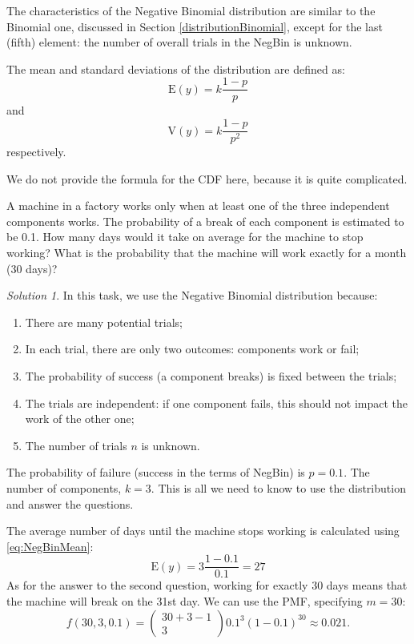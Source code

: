 \documentclass[
]{book}
\providecommand{\tightlist}{%
  \setlength{\itemsep}{0pt}\setlength{\parskip}{0pt}}
\theoremstyle{definition}
\theoremstyle{definition}
\theoremstyle{definition}
\theoremstyle{definition}
\theoremstyle{remark}
\newtheorem*{solution}{Solution}
\begin{document}
The characteristics of the Negative Binomial distribution are similar to the Binomial one, discussed in Section \ref{distributionBinomial}, except for the last (fifth) element: the number of overall trials in the NegBin is unknown.

The mean and standard deviations of the distribution are defined as:
\begin{equation}
    \mathrm{E}(y) = k \frac{1-p}{p}
    \label{eq:NegBinMean}
\end{equation}
and
\begin{equation}
    \mathrm{V}(y) = k \frac{1-p}{p^2}
    \label{eq:NegBinVar}
\end{equation}
respectively.

We do not provide the formula for the CDF here, because it is quite complicated.

A machine in a factory works only when at least one of the three independent components works. The probability of a break of each component is estimated to be 0.1. How many days would it take on average for the machine to stop working? What is the probability that the machine will work exactly for a month (30 days)?

\begin{solution}
In this task, we use the Negative Binomial distribution because:

\begin{enumerate}
\def\labelenumi{\arabic{enumi}.}
\tightlist
\item
  There are many potential trials;
\item
  In each trial, there are only two outcomes: components work or fail;
\item
  The probability of success (a component breaks) is fixed between the trials;
\item
  The trials are independent: if one component fails, this should not impact the work of the other one;
\item
  The number of trials \(n\) is unknown.
\end{enumerate}

The probability of failure (success in the terms of NegBin) is \(p=0.1\). The number of components, \(k=3\). This is all we need to know to use the distribution and answer the questions.

The average number of days until the machine stops working is calculated using \eqref{eq:NegBinMean}:
\begin{equation}
    \mathrm{E}(y) = 3 \frac{1-0.1}{0.1} = 27
    \label{eq:NegBinMean}
\end{equation}
As for the answer to the second question, working for exactly 30 days means that the machine will break on the 31st day. We can use the PMF, specifying \(m=30\):
\begin{equation*}
    f(30, 3, 0.1) = \begin{pmatrix} 30+3-1 \\ 3 \end{pmatrix} 0.1^3 (1-0.1)^30 \approx 0.021 .
\end{equation*}
\end{solution}
\end{document}
